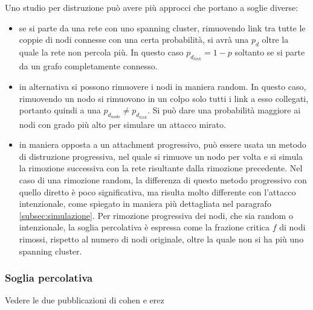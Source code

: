 Uno studio per distruzione pu\`o avere pi\`u approcci che portano a soglie diverse:
\begin{itemize}
 \item se si parte da una rete con uno spanning cluster, rimuovendo link tra tutte le coppie di nodi connesse con una certa probabilit\`a, si avr\`a una $p_d$ oltre la quale la rete non percola pi\`u. In questo caso $p_{d_{link}} = 1-p$ soltanto se si parte da un grafo completamente connesso.
 \item in alternativa si possono rimuovere i nodi in maniera random. In questo caso, rimuovendo un nodo si rimuovono in un colpo solo tutti i link a esso collegati, portanto quindi a una $p_{d_{nodo}} \neq p_{d_{link}}$. Si pu\`o dare una probabilit\`a maggiore ai nodi con grado pi\`u alto per simulare un attacco mirato.
 \item in maniera opposta a un attachment progressivo, pu\`o essere usata un metodo di distruzione progressiva, nel quale si rimuove un nodo per volta e si simula la rimozione successiva con la rete risultante dalla rimozione precedente. Nel caso di una rimozione random, la differenza di questo metodo progressivo con quello diretto \`e poco significativa, ma risulta molto differente con l'attacco intenzionale, come spiegato in maniera pi\`u dettagliata nel paragrafo \ref{subsec:simulazione}. Per rimozione progressiva dei nodi, che sia random o intenzionale, la soglia percolativa \`e espressa come la frazione critica $f$ di nodi rimossi, rispetto al numero di nodi originale, oltre la quale non si ha pi\`u uno spanning cluster.
\end{itemize}

\subsubsection{Soglia percolativa} 
Vedere le due pubblicazioni di cohen e erez


\clearpage